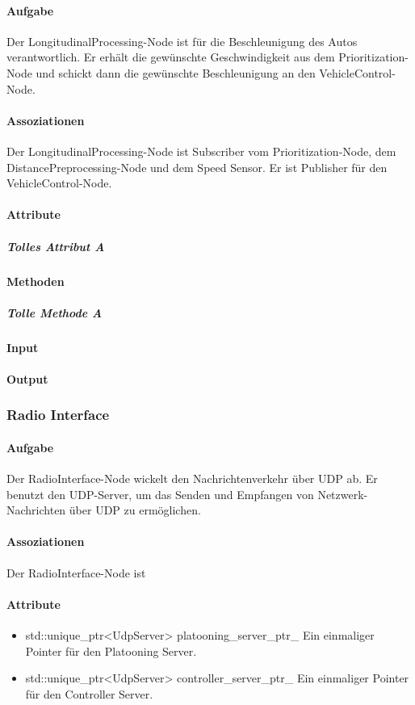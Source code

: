 \documentclass[a4paper, 12pt, titlepage]{scrartcl}
\begin{document}
				\paragraph{Aufgabe} Der LongitudinalProcessing-Node ist für die Beschleunigung des Autos verantwortlich. Er erhält die gewünschte Geschwindigkeit aus dem Prioritization-Node und schickt dann die gewünschte Beschleunigung an den VehicleControl-Node. 
				\paragraph{Assoziationen} Der LongitudinalProcessing-Node ist Subscriber vom Prioritization-Node, dem DistancePreprocessing-Node und dem Speed Sensor. Er ist Publisher für den VehicleControl-Node. 
				\paragraph{Attribute}
					\subparagraph{Tolles Attribut A}
				\paragraph{Methoden}
					\subparagraph{Tolle Methode A}
				\paragraph{Input}
				\paragraph{Output}
						
			\subsubsection{Radio Interface}
			\label{radio_interface}
				\paragraph{Aufgabe} Der RadioInterface-Node wickelt den Nachrichtenverkehr über UDP ab. Er benutzt den UDP-Server, um das Senden und Empfangen von Netzwerk-Nachrichten über UDP zu ermöglichen. 
				\paragraph{Assoziationen} Der RadioInterface-Node ist 
				\paragraph{Attribute}
					\begin{itemize}
					    \item std::unique\_ptr<UdpServer> platooning\_server\_ptr\_ Ein einmaliger Pointer für den Platooning Server. 
					    \item std::unique\_ptr<UdpServer> controller\_server\_ptr\_ Ein einmaliger Pointer für den Controller Server. 
					\end{itemize}
\end{document}

